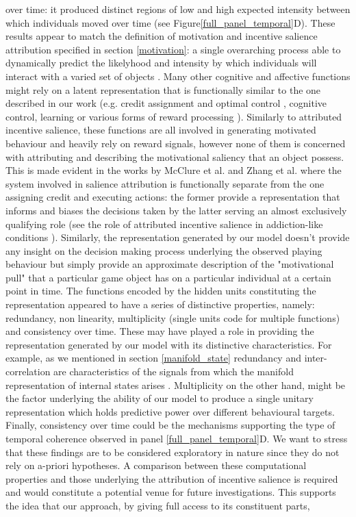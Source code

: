 over time: it produced distinct regions of low and high expected intensity between which individuals moved over time (see Figure\ref{full_panel_temporal}D). These results appear to match the definition of motivation and incentive salience attribution specified in section \ref{motivation}: a single overarching process able to dynamically predict the likelyhood and intensity by which individuals will interact with a varied set of objects \cite{simpson2016behavioral,toates1994comparing,berridge2004motivation,zhang2009neural}. Many other cognitive and affective functions might rely on a latent representation that is functionally similar to the one described in our work (e.g. credit assignment and optimal control \cite{wang2018prefrontal, barto2004reinforcement}, cognitive control, learning \cite{skinner1965science} or various forms of reward processing \cite{schultz1997neural, schultz2000reward}). Similarly to attributed incentive salience, these functions are all involved in generating motivated behaviour and heavily rely on reward signals, however none of them is concerned with attributing and describing the motivational saliency that an object possess. This is made evident in the works by McClure et al. \cite{mcclure2003computational} and Zhang et al. \cite{zhang2009neural} where the system involved in salience attribution is functionally separate from the one assigning credit and executing actions: the former provide a representation that informs and biases the decisions taken by the latter serving an almost exclusively qualifying role (see the role of attributed incentive salience in addiction-like conditions \cite{robinson1993neural}). Similarly, the representation generated by our model doesn't provide any insight on the decision making process underlying the observed playing behaviour but simply provide an approximate description of the "motivational pull" that a particular game object has on a particular individual at a certain point in time. The functions encoded by the hidden units constituting the representation appeared to have a series of distinctive properties, namely: redundancy, non linearity, multiplicity (single units code for multiple functions) and consistency over time. These may have played a role in providing the representation generated by our model with its distinctive characteristics. For example, as we mentioned in section \ref{manifold_state} redundancy and inter-correlation are characteristics of the signals from which the manifold representation of internal states arises \cite{seung2000manifold,gallego2017neural}. Multiplicity on the other hand, might be the factor underlying the ability of our model to produce a single unitary representation which holds predictive power over different behavioural targets. Finally, consistency over time could be the mechanisms supporting the type of temporal coherence observed in panel \ref{full_panel_temporal}D. We want to stress that these findings are to be considered exploratory in nature since they do not rely on a-priori hypotheses. A comparison between these computational properties and those underlying the attribution of incentive salience is required and would constitute a potential venue for future investigations. This supports the idea that our approach, by giving full access to its constituent parts, 